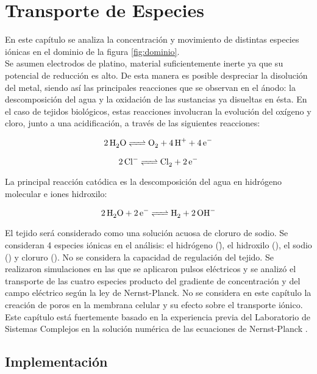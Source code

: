 \chapter{Transporte de Especies} \label{chap:trans}

En este capítulo se analiza la concentración y movimiento de distintas especies iónicas en el dominio de la figura \ref{fig:dominio}. \\

Se asumen electrodos de platino, material suficientemente inerte ya que su potencial de reducción es alto. De esta manera es posible despreciar la disolución del metal, siendo así las principales reacciones que se observan en el ánodo: la descomposición del agua y la oxidación de las sustancias ya disueltas en ésta. En el caso de tejidos biológicos, estas reacciones involucran la evolución del oxígeno y cloro, junto a una acidificación, a través de las siguientes reacciones:

\begin{equation}
	\ce{2H_2O <=> O_2 + 4H^+ + 4e^-}
\end{equation}

\begin{equation}
	\ce{2Cl^- <=> Cl_2 + 2e^-}	
\end{equation}

La principal reacción catódica es la descomposición del agua en hidrógeno molecular e iones hidroxilo:

\begin{equation}
	\ce{2H_2O + 2e^- <=> H_2 + 2OH^-}
\end{equation}

El tejido será considerado como una solución acuosa de cloruro de sodio. Se consideran 4 especies iónicas en el análisis: el hidrógeno (\h), el hidroxilo (\oh), el sodio (\na) y cloruro (\cl). No se considera la capacidad de regulación del tejido. Se realizaron simulaciones en las que se aplicaron pulsos eléctricos y se analizó el transporte de las cuatro especies producto del gradiente de concentración y del campo eléctrico según la ley de Nernst-Planck. No se considera en este capítulo la creación de poros en la membrana celular y su efecto sobre el transporte iónico. Este capítulo está fuertemente basado en la experiencia previa del Laboratorio de Sistemas Complejos en la solución numérica de las ecuaciones de Nernst-Planck \cite{colombo, turjanski, turjanski2, olaiz, suarez}.

\section{Implementación}


